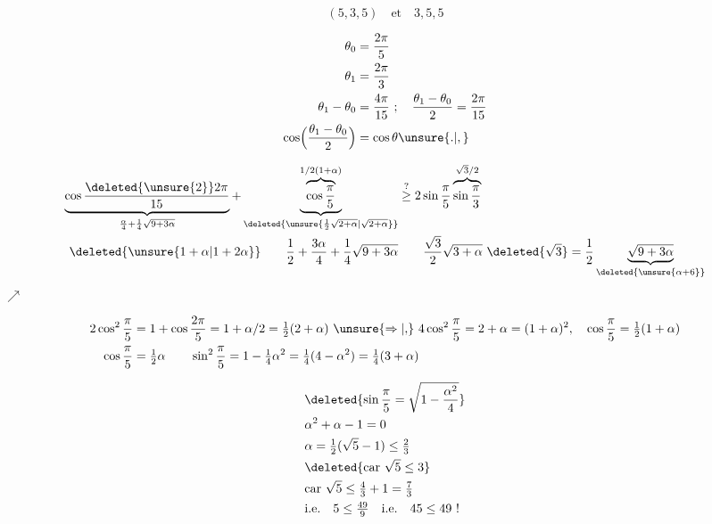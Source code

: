\[
 \boxed{(5,3,5)}\quad\text{et}\quad\boxed{3,5,5}
\]

\[
\begin{aligned}
\theta_0&=\frac{2\pi}{5}\\
\theta_1&=\frac{2\pi}{3}\\
\theta_1-\theta_0&=\frac{4\pi}{15}\ ;\quad \frac{\theta_1-\theta_0}{2}=\frac{2\pi}{15}\\
\cos\Bigl(\frac{\theta_1-\theta_0}{2}\Bigr)&=\cos\theta\unsure{.|,}
\end{aligned}
\]

\[
\begin{aligned}
 \underbrace{\cos\frac{\deleted{\unsure{2}}2\pi}{15}}_{\frac{\alpha}4+\frac14\sqrt{9+3\alpha}}
 +\underbrace{\overbrace{\cos\frac{\pi}{5}}^{1/2(1+\alpha)}}_{\deleted{\unsure{\frac12\sqrt{2+\alpha}|\sqrt{2+\alpha}}}}
 &\overset{?}{\geq}2\sin\frac{\pi}{5}\overbrace{\sin\frac{\pi}{3}}^{\sqrt3/2}\\
 \deleted{\unsure{1+\alpha|1+2\alpha}}\qquad
 \frac12+\frac{3\alpha}4+\frac14\sqrt{9+3\alpha}
 &\qquad\frac{\sqrt3}{2}\sqrt{3+\alpha}\ \deleted{\sqrt3}
 =\frac12\underbrace{\sqrt{9+3\alpha}}_{\deleted{\unsure{\alpha+6}}}
\end{aligned}
\]
\,$\nearrow$

\[
\begin{aligned}
2\cos^2\frac{\pi}{5}&=1+\cos\frac{2\pi}{5}=1+\alpha/2=\tfrac12(2+\alpha)
 \ \unsure{\Rightarrow|,\!}\ 4\cos^2\frac{\pi}{5}=2+\alpha=(1+\alpha)^2,\quad
 \cos\frac{\pi}{5}=\tfrac12(1+\alpha)\\
\cos\frac{\pi}{5}&=\tfrac12\alpha\qquad
 \sin^2\frac{\pi}{5}=1-\tfrac14\alpha^2=\tfrac14(4-\alpha^2)=\tfrac14(3+\alpha)
\end{aligned}
\]

\[
\begin{aligned}
 &\deleted{\sin\frac{\pi}{5}=\sqrt{1-\frac{\alpha^2}{4}}}\\
 &\alpha^2+\alpha-1=0\\
 &\alpha=\tfrac12(\sqrt5-1)\leq\tfrac23\\
 &\deleted{\text{car }\sqrt5\leq3}\\
 &\text{car }\sqrt5\leq\tfrac43+1=\tfrac73\\
 &\text{i.e.}\quad5\leq\tfrac{49}{9}\quad\text{i.e.}\quad45\leq49\ !
\end{aligned}
\]

